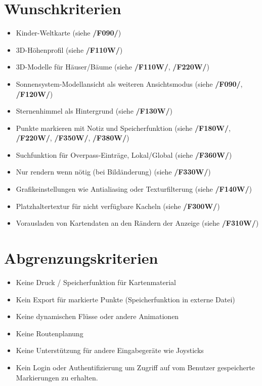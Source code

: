 \documentclass[10pt]{scrreprt}
\begin{document}
\section{Wunschkriterien}
\begin{itemize}
\item Kinder-Weltkarte (siehe \textbf{/F090/})
\item 3D-Höhenprofil (siehe \textbf{/F110W/})
\item 3D-Modelle für Häuser/Bäume (siehe \textbf{/F110W/}, \textbf{/F220W/})
\item Sonnensystem-Modellansicht als weiteren Ansichtsmodus (siehe \textbf{/F090/}, \textbf{/F120W/})
\item Sternenhimmel als Hintergrund (siehe \textbf{/F130W/})
\item Punkte markieren mit Notiz und Speicherfunktion (siehe \textbf{/F180W/}, \textbf{/F220W/}, \textbf{/F350W/}, \textbf{/F380W/})
\item Suchfunktion für Overpass-Einträge, Lokal/Global (siehe \textbf{/F360W/})
\item Nur rendern wenn nötig (bei Bildänderung) (siehe \textbf{/F330W/})
\item Grafikeinstellungen wie Antialiasing oder Texturfilterung (siehe \textbf{/F140W/})
\item Platzhaltertextur für nicht verfügbare Kacheln (siehe \textbf{/F300W/})
\item Vorausladen von Kartendaten an den Rändern der Anzeige (siehe \textbf{/F310W/})
\end{itemize}

\section{Abgrenzungskriterien}
\begin{itemize}
\item Keine Druck / Speicherfunktion für Kartenmaterial
\item Kein Export für markierte Punkte (Speicherfunktion in externe Datei)
\item Keine dynamischen Flüsse oder andere Animationen
\item Keine Routenplanung
\item Keine Unterstützung für andere Eingabegeräte wie Joysticks
\item Kein Login oder Authentifizierung um Zugriff auf vom Benutzer gespeicherte Markierungen zu erhalten.
\end{itemize}
\end{document}
